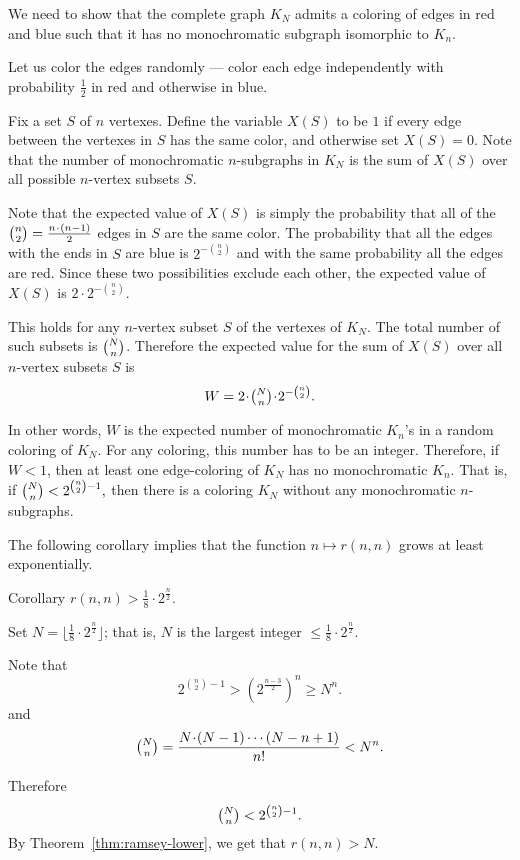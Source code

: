 We need to show that the complete graph $K_N$
admits a coloring of edges in red and blue such that it has no monochromatic subgraph isomorphic to $K_n$.

Let us color the edges randomly ---
color each edge independently with probability $\tfrac12$ in red and otherwise in blue.

Fix a set $S$ of $n$ vertexes. 
Define the variable $X(S)$ to be $1$ if every edge between the vertexes in $S$ has the same color, and otherwise set $X(S)=0$.
Note that the number of monochromatic $n$-subgraphs in $K_N$ is the sum of $X(S)$ over all possible $n$-vertex subsets $S$. 

Note that the expected value of $X(S)$ is simply the probability that all of the $\tbinom n 2=\tfrac{n\cdot(n-1)}{2}$
edges in $S$ are the same color. 
The probability that all the edges with the ends in $S$ are blue is ${2^{-\binom n 2}}$ and with the same probability all the edges are red.
Since these two possibilities exclude each other, the expected value of $X(S)$ is 
${2}\cdot {2^{-\binom n 2}}.$

This holds for any $n$-vertex subset $S$ of the vertexes of $K_N$.
The total number of such subsets is $\tbinom N n$.
Therefore the expected value for the sum of $X(S)$ over all $n$-vertex subsets $S$ is
\[W=2\cdot \tbinom N n\cdot 2^{-\binom n 2}.\]

In other words, $W$ is the expected number of monochromatic $K_n$'s in a random coloring of $K_N$.
For any coloring, this number has to be an integer.
Therefore, if $W<1$, then at least one edge-coloring of $K_N$ has no monochromatic $K_n$. 
That is, if
$\tbinom N n < 2^{\binom n 2 - 1},$
then there is a coloring $K_N$ without any monochromatic $n$-subgraphs.
\qeds

The following corollary implies that the function $n\mapsto r(n,n)$ grows at least exponentially. 

\begin{thm}{Corollary}\label{cor:2^n/2}
$r(n, n)> \tfrac1{8}\cdot 2^{\frac{n}{2}}$.
\end{thm}

Set $N=\lfloor\tfrac1{8}\cdot 2^{\frac{n}{2}}\rfloor$;
that is, $N$ is the largest integer $\le\tfrac1{8}\cdot 2^{\frac{n}{2}}$.

Note that 
\[2^{\binom n 2 - 1}> (2^{\frac{n-3}2})^n\ge N^n.\]
and
\[\tbinom N n=\frac{N\cdot(N-1)\cdots (N-n+1)}{n!}<  N^n.\]

Therefore  
\[\tbinom N n<2^{\binom n 2 - 1}.\]
By Theorem~\ref{thm:ramsey-lower}, we get that $r(n,n)> N$.
\qeds

